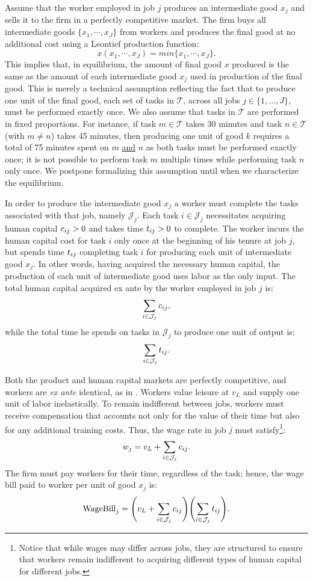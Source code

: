 \documentclass{article}
\theoremstyle{plain}
\theoremstyle{plain}
\begin{document}
Assume that the worker employed in job $j$ produces an intermediate good $x_j$ and sells it to the firm in a perfectly competitive market.
The firm buys all intermediate goods $\{x_1, \cdots, x_J\}$ from workers and produces the final good at no additional cost using a Leontief production function:
\[
x(x_1, \cdots, x_J) = min\{x_1, \cdots, x_J\}.
\]
This implies that, in equilibrium, the amount of final good $x$ produced is the same as the amount of each intermediate good $x_j$ used in production of the final good.
This is merely a technical assumption reflecting the fact that to produce one unit of the final good, each set of tasks in $\mathcal{T}$, across all jobs $j \in \{1,\ldots,J\}$, must be performed exactly once.
We also assume that tasks in $\mathcal{T}\!$ are performed in fixed proportions.
For instance, if task $m \in \mathcal{T}$ takes 30 minutes and task $n \in \mathcal{T}$ (with $m \neq n$) takes 45 minutes, then producing one unit of good $k$ requires a total of 75 minutes spent on $m$ \underline{and} $n$ as both tasks must be performed exactly once; it is not possible to perform task $m$ multiple times while performing task $n$ only once.
We postpone formalizing this assumption until when we characterize the equilibrium.

In order to produce the intermediate good $x_j$ a worker must complete the tasks associated with that job, namely $\mathcal{J}_j$.
Each task $i \in \mathcal{J}_j$ necessitates acquiring human capital $c_{ij} > 0$ and takes time $t_{ij} > 0$ to complete.
The worker incurs the human capital cost for task $i$ only once at the beginning of his tenure at job $j$, but spends time $t_{ij}$ completing task $i$ for producing each unit of intermediate good $x_j$. 
In other words, having acquired the necessary human capital, the production of each unit of intermediate good uses labor as the only input.
The total human capital acquired ex ante by the worker employed in job $j$ is:
\[
\sum_{i \in \mathcal{J}_j} c_{ij},
\]
while the total time he spends on tasks in $\mathcal{J}_j$ to produce one unit of output is:
\[
\sum_{i \in \mathcal{J}_j} t_{ij}.
\]

Both the product and human capital markets are perfectly competitive, and workers are \emph{ex ante} identical, as in \cite{becker1992division}.
Workers value leisure at $v_L$ and supply one unit of labor inelastically.
To remain indifferent between jobs, workers must receive compensation that accounts not only for the value of their time but also for any additional training costs.
Thus, the wage rate in job $j$ must satisfy\footnote{Notice that while wages may differ across jobs, they are structured to ensure that workers remain indifferent to acquiring different types of human capital for different jobs.}:
\[
w_j = v_L + \sum_{i \in \mathcal{J}_j} c_{ij}.
\]
The firm must pay workers for their time, regardless of the task; hence, the wage bill paid to worker per unit of good $x_j$ is:
\[
\text{WageBill}_j = \Biggl(v_L + \sum_{i \in \mathcal{J}_j} c_{ij} \Biggr) \Biggl(\sum_{i \in \mathcal{J}_j} t_{ij} \Biggr).
\]
\end{document}
